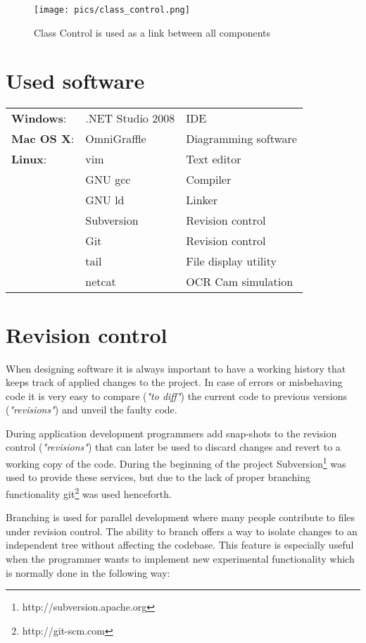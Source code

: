 \documentclass[oneside,bachelor,etd]{BYUPhys}
\begin{document}
\begin{figure}[p]
    \centerline{\texttt{[image: pics/class\_control.png]}}
    \caption[Class Control]{\label{fig:Class Control}
	Class Control is used as a link between all components}
\end{figure}


\section{Used software}
\label{sec:2usedsw}

\begin{tabular} { l l l }
	\textbf{Windows}:	&	.NET Studio 2008		&	IDE								\\
	\textbf{Mac OS X}:	&	OmniGraffle				&	Diagramming software	\\
	\textbf{Linux}:			&	vim							&	Text editor 					\\
									&	GNU gcc					&	Compiler						\\
									&	GNU ld						&	Linker							\\
									&	Subversion				&	Revision control			\\
									&	Git							&	Revision control			\\
									&	tail							&	File display utility		\\
									&	netcat						&	OCR Cam simulation	\\
\end{tabular}


\section{Revision control}
\label{sec:2revcontrol}

When designing software it is always important to have a working history that keeps track of applied changes to the project.
In case of errors or misbehaving code it is very easy to compare (\textit{"to diff"}) the current code to previous versions (\textit{"revisions"})
and unveil the faulty code. 
\par During application development programmers add snap-shots to the revision control (\textit{"revisions"}) 
that can later be used to discard changes and revert to a working copy of the code. During the beginning of the project 
Subversion\footnote{\label{Apache:2} http://subversion.apache.org} was used to provide these services, 
but due to the lack of proper branching functionality git\footnote{\label{git:3} http://git-scm.com} was used henceforth.
\par Branching is used for parallel development where many people contribute to files under revision control.
The ability to branch offers a way to isolate changes to an independent tree without affecting the codebase. 
This feature is especially useful when the programmer wants to implement new experimental functionality which is normally done in the following way:
\end{document}
